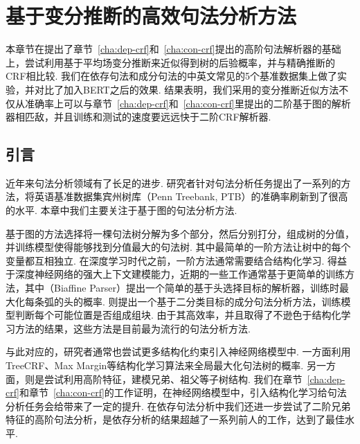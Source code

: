 \chapter{基于变分推断的高效句法分析方法}
\label{cha:vi}

本章节在提出了章节~\ref{cha:dep-crf}和~\ref{cha:con-crf}提出的高阶句法解析器的基础上，尝试利用基于平均场变分推断来近似得到树的后验概率，并与精确推断的CRF相比较.
我们在依存句法和成分句法的中英文常见的5个基准数据集上做了实验，并对比了加入BERT之后的效果.
结果表明，我们采用的变分推断近似方法不仅从准确率上可以与章节~\ref{cha:dep-crf}和~\ref{cha:con-crf}里提出的二阶基于图的解析器相匹敌，并且训练和测试的速度要远远快于二阶CRF解析器.

\section{引言}\label{sec:vi-intro}
近年来句法分析领域有了长足的进步.
研究者针对句法分析任务提出了一系列的方法\citep{dozat-etal-2017-biaffine,gomez-rodriguez-vilares-2018-constituent,ji-etal-2019-graph,zhang-etal-2020-fast,wei-etal-2020-span}，将英语基准数据集宾州树库（Penn Treebank, PTB）的准确率刷新到了很高的水平.
本章中我们主要关注于基于图的句法分析方法.

基于图的方法选择将一棵句法树分解为多个部分，然后分别打分，组成树的分值，并训练模型使得能够找到分值最大的句法树.
其中最简单的一阶方法让树中的每个变量都互相独立.
在深度学习时代之前，一阶方法通常需要结合结构化学习\citep{mcdonald-etal-2005-online,koo-etal-2007-structured,taskar-etal-2004-max}.
得益于深度神经网络的强大上下文建模能力，近期的一些工作通常基于更简单的训练方法，其中\citet{dozat-etal-2017-biaffine}（Biaffine Parser）提出一个简单的基于头选择目标的解析器，训练时最大化每条弧的头的概率.
\citet{gaddy-etal-2018-whats}则提出一个基于二分类目标的成分句法分析方法，训练模型判断每个可能位置是否组成组块.
由于其高效率，并且取得了不逊色于结构化学习方法的结果\citep{zhang-etal-2019-empirical,falenska-kuhn-2019-non}，这些方法是目前最为流行的句法分析方法.

与此对应的，研究者通常也尝试更多结构化约束引入神经网络模型中.
一方面利用TreeCRF、Max Margin\citep{ma-hovy-2017-neural,falenska-kuhn-2019-non,stern-etal-2017-minimal}等结构化学习算法来全局最大化句法树的概率.
另一方面，则是尝试利用高阶特征，建模兄弟、祖父等子树结构\citep{mcdonald-pereira-2006-online,koo-collins-2010-efficient}.
我们在章节~\ref{cha:dep-crf}和章节~\ref{cha:con-crf}的工作证明，在神经网络模型中，引入结构化学习给句法分析任务会给带来了一定的提升.
在依存句法分析中我们还进一步尝试了二阶兄弟特征的高阶句法分析，是依存分析的结果超越了一系列前人的工作，达到了最佳水平.

